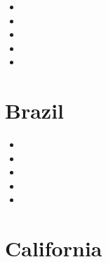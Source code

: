 \begin{small}
\begin{itemize}
\item[\twothousandnine]
\item[\twothousandten]
\item[\twothousandtwentyone]
\item[\twothousandtwentytwo]
\item[\twothousandtwentyfour]
\end{itemize}
\end{small}


\section{Brazil}

\begin{small}
\begin{itemize}
\item[2013]
\item[2004] 
\item[2019]
\item[2022]
\item[2024]
\end{itemize}
\end{small}




\section{California}


